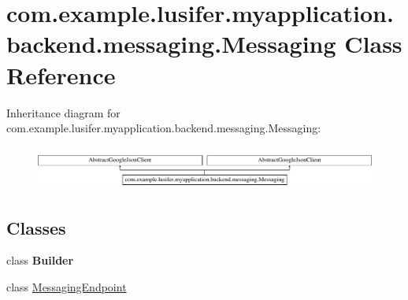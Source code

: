 \hypertarget{classcom_1_1example_1_1lusifer_1_1myapplication_1_1backend_1_1messaging_1_1_messaging}{}\section{com.\+example.\+lusifer.\+myapplication.\+backend.\+messaging.\+Messaging Class Reference}
\label{classcom_1_1example_1_1lusifer_1_1myapplication_1_1backend_1_1messaging_1_1_messaging}
Inheritance diagram for com.\+example.\+lusifer.\+myapplication.\+backend.\+messaging.\+Messaging\+:\begin{figure}[H]
\begin{center}
\leavevmode
\includegraphics[height=1.424936cm]{classcom_1_1example_1_1lusifer_1_1myapplication_1_1backend_1_1messaging_1_1_messaging}
\end{center}
\end{figure}
\subsection*{Classes}
\begin{DoxyCompactItemize}
\item 
class {\bfseries Builder}
\item 
class \hyperlink{classcom_1_1example_1_1lusifer_1_1myapplication_1_1backend_1_1messaging_1_1_messaging_1_1_messaging_endpoint}{Messaging\+Endpoint}
\end{DoxyCompactItemize}

